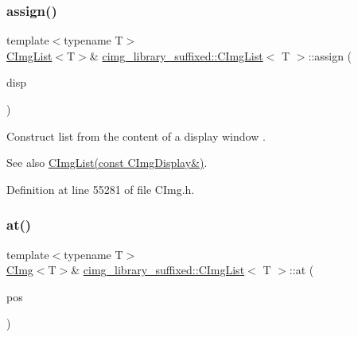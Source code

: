\subsubsection{\texorpdfstring{assign()}{assign()}\hspace{0.1cm}{\footnotesize\ttfamily [18/18]}}
{\footnotesize\ttfamily template$<$typename T$>$ \\
\hyperlink{structcimg__library__suffixed_1_1CImgList}{C\+Img\+List}$<$T$>$\& \hyperlink{structcimg__library__suffixed_1_1CImgList}{cimg\+\_\+library\+\_\+suffixed\+::\+C\+Img\+List}$<$ T $>$\+::assign (\begin{DoxyParamCaption}\item[{const \hyperlink{structcimg__library__suffixed_1_1CImgDisplay}{C\+Img\+Display} \&}]{disp }\end{DoxyParamCaption})\hspace{0.3cm}{\ttfamily [inline]}}



Construct list from the content of a display window . 

\begin{DoxySeeAlso}{See also}
\hyperlink{structcimg__library__suffixed_1_1CImgList_a32dbe3f9509eb41b2a18f4b68c737b39}{C\+Img\+List(const C\+Img\+Display\&)}. 
\end{DoxySeeAlso}


Definition at line 55281 of file C\+Img.\+h.

\mbox{\label{structcimg__library__suffixed_1_1CImgList_abbaca68670ef9bb45b18b7f48c79d2da}} 
\subsubsection{\texorpdfstring{at()}{at()}}
{\footnotesize\ttfamily template$<$typename T$>$ \\
\hyperlink{structcimg__library__suffixed_1_1CImg}{C\+Img}$<$T$>$\& \hyperlink{structcimg__library__suffixed_1_1CImgList}{cimg\+\_\+library\+\_\+suffixed\+::\+C\+Img\+List}$<$ T $>$\+::at (\begin{DoxyParamCaption}\item[{const int}]{pos }\end{DoxyParamCaption})\hspace{0.3cm}{\ttfamily [inline]}}



